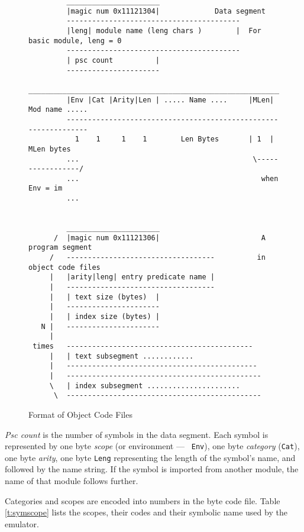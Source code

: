 \documentclass[11pt]{article}
\begin{document}
\begin{figure}
\begin{verbatim}
         ______________________
         |magic num 0x11121304|				Data segment
         -----------------------------------------
         |leng| module name (leng chars )        |  For basic module, leng = 0
         -----------------------------------------
         | psc count          |
         ----------------------
         ________________________________________________________________
         |Env |Cat |Arity|Len | ..... Name ....     |MLen| Mod name .....
         ----------------------------------------------------------------
           1    1     1    1        Len Bytes       | 1  |  MLen bytes
         ...                                         \-----------------/
         ...                                           when Env = im
         ...


         ______________________
      /  |magic num 0x11121306|                        A program segment
     /   -----------------------------------          in object code files
     |   |arity|leng| entry predicate name |
     |   -----------------------------------
     |   | text size (bytes)  |
     |   ----------------------
     |   | index size (bytes) |
   N |   ----------------------
     |
 times   --------------------------------------------
     |   | text subsegment ............
     |   ---------------------------------------------
     |   ----------------------------------------------
     \   | index subsegment ......................
      \  ----------------------------------------------

\end{verbatim}
\caption{Format of Object Code Files}
\label{f:objectfile}
\end{figure}

{\it Psc count} is the number of symbols in the data segment.  Each
symbol is represented by one byte {\it scope} (or environment --- {\tt
Env}), one byte {\it category} ({\tt Cat}), one byte {\it arity}, one
byte {\tt Leng} representing the length of the symbol's name, and
followed by the name string. If the symbol is imported from another
module, the name of that module follows further.

Categories and scopes are encoded into numbers in the byte code file.
Table \ref{t:symscope} lists the scopes, their codes and their symbolic
name used by the emulator.
\end{document}
